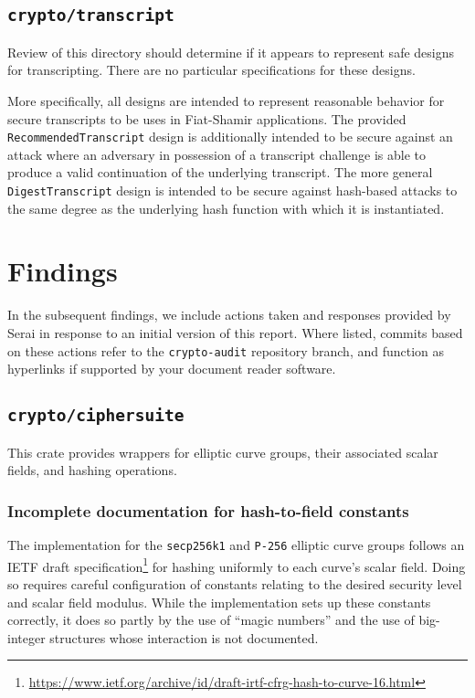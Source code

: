 \documentclass{article}
\begin{document}
\subsection{\texttt{crypto/transcript}}

Review of this directory should determine if it appears to represent safe designs for transcripting.
There are no particular specifications for these designs.

More specifically, all designs are intended to represent reasonable behavior for secure transcripts to be uses in Fiat-Shamir applications.
The provided \texttt{RecommendedTranscript} design is additionally intended to be secure against an attack where an adversary in possession of a transcript challenge is able to produce a valid continuation of the underlying transcript.
The more general \texttt{DigestTranscript} design is intended to be secure against hash-based attacks to the same degree as the underlying hash function with which it is instantiated.


\section{Findings}

In the subsequent findings, we include actions taken and responses provided by Serai in response to an initial version of this report.
Where listed, commits based on these actions refer to the \texttt{crypto-audit} repository branch, and function as hyperlinks if supported by your document reader software.


\subsection{\texttt{crypto/ciphersuite}}

This crate provides wrappers for elliptic curve groups, their associated scalar fields, and hashing operations.


\subsubsection{Incomplete documentation for hash-to-field constants}

The implementation for the \texttt{secp256k1} and \texttt{P-256} elliptic curve groups follows an IETF draft specification\footnote{\url{https://www.ietf.org/archive/id/draft-irtf-cfrg-hash-to-curve-16.html}} for hashing uniformly to each curve's scalar field.
Doing so requires careful configuration of constants relating to the desired security level and scalar field modulus.
While the implementation sets up these constants correctly, it does so partly by the use of ``magic numbers'' and the use of big-integer structures whose interaction is not documented.
\end{document}
